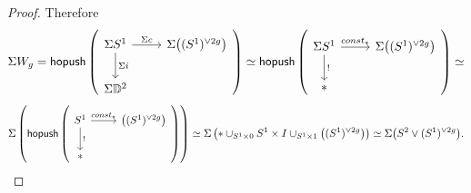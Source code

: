 \documentclass{amsart}
\theoremstyle{definition}
\theoremstyle{remark}
\begin{document}
\begin{proof}
Therefore $$\Sigma W_{g} = {\sf hopush} \left( \begin{tikzcd}
\Sigma S^{1} \arrow[r, "\Sigma c"] \arrow[d, "\Sigma i"] & \Sigma\big( (S^{1})^{\vee 2g} \big) \\
\Sigma \DD^{2}
\end{tikzcd} \right) \simeq 
{\sf hopush} \left( \begin{tikzcd}
\Sigma S^{1} \arrow[r, "const_{\ast}"] \arrow[d, "!"] & \Sigma\big( (S^{1})^{\vee 2g} \big) \\
\ast
\end{tikzcd} \right) \simeq$$ 
$$ 
\Sigma \left( {\sf hopush} \left( \begin{tikzcd}
S^{1} \arrow[r, "const_{\ast}"] \arrow[d, "!"] & \big( (S^{1})^{\vee 2g} \big) \\
\ast
\end{tikzcd} \right) \right) \simeq
\Sigma \left(\ast \cup_{S^{1} \times 0} S^{1} \times I \cup_{S^{1} \times 1} \big( (S^{1})^{\vee 2g} \big)\right) \simeq \Sigma \big( S^{2} \vee (S^{1})^{\vee 2g}\big).
$$
\end{proof}
\end{document}
